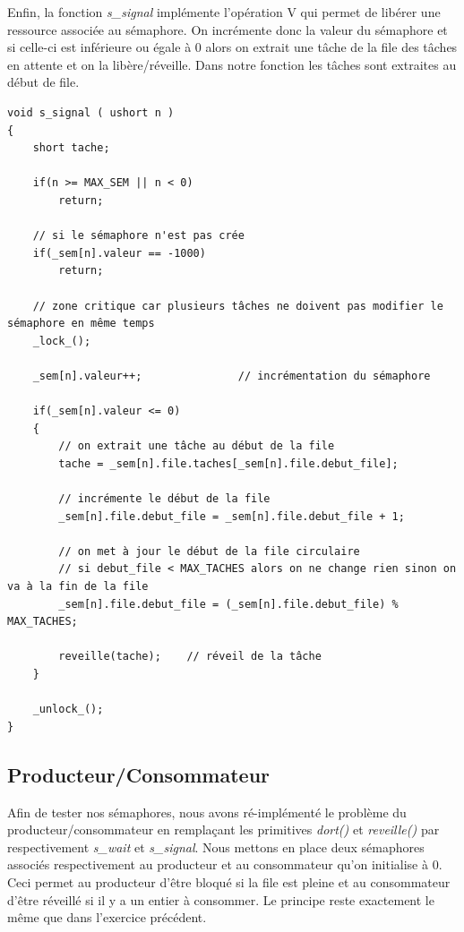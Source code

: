\documentclass[a4paper,12pt]{report}
\begin{document}
Enfin, la fonction \textit{s\_signal} implémente l'opération V qui permet de libérer une ressource associée au sémaphore. On incrémente donc la valeur du sémaphore et si celle-ci est inférieure ou égale à 0 alors on extrait une tâche de la file des tâches en attente et on la libère/réveille. Dans notre fonction les tâches sont extraites au début de file.\newline

\begin{lstlisting}
void s_signal ( ushort n )
{
	short tache;

	if(n >= MAX_SEM || n < 0)
		return;

	// si le sémaphore n'est pas crée
	if(_sem[n].valeur == -1000)		
		return;

	// zone critique car plusieurs tâches ne doivent pas modifier le sémaphore en même temps
	_lock_();						

	_sem[n].valeur++;				// incrémentation du sémaphore

	if(_sem[n].valeur <= 0)
	{
		// on extrait une tâche au début de la file
		tache = _sem[n].file.taches[_sem[n].file.debut_file]; 	
		
		// incrémente le début de la file
		_sem[n].file.debut_file = _sem[n].file.debut_file + 1;		
		
		// on met à jour le début de la file circulaire
		// si debut_file < MAX_TACHES alors on ne change rien sinon on va à la fin de la file
		_sem[n].file.debut_file = (_sem[n].file.debut_file) % MAX_TACHES; 

		reveille(tache);	// réveil de la tâche
	}

	_unlock_();
}
\end{lstlisting}

\subsection{Producteur/Consommateur}

Afin de tester nos sémaphores, nous avons ré-implémenté le problème du producteur/consommateur en remplaçant les primitives \textit{dort()} et \textit{reveille()} par respectivement \textit{s\_wait} et \textit{s\_signal}. Nous mettons en place deux sémaphores associés respectivement au producteur et au consommateur qu'on initialise à 0. Ceci permet au producteur d'être bloqué si la file est pleine et au consommateur d'être réveillé si il y a un entier à consommer. Le principe reste exactement le même que dans l'exercice précédent. 
\end{document}

